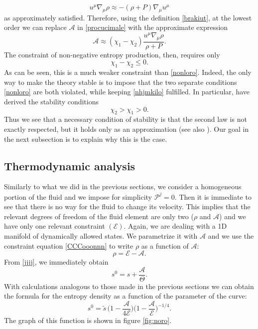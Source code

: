 \documentclass[a4paper, amsfonts, amssymb, amsmath, reprint, showkeys, nofootinbib, twoside]{revtex4-1}
\begin{document}
\begin{equation}\label{bhimogvrnefvo}
u^\mu \nabla_\mu \rho \approx -(\rho+P)\nabla_\mu u^\mu
\end{equation}
as approximately satisfied. Therefore, using the definition \eqref{brakiut}, at the lowest order we can replace $\mathcal{A}$ in \eqref{procucimale} with the approximate expression   
\begin{equation}\label{mleko}
\mathcal{A} \approx (\chi_1-\chi_2) \dfrac{u^\mu \nabla_\mu \rho}{\rho + P}.
\end{equation} 
The constraint of non-negative entropy production, then, requires only
\begin{equation}\label{nhjmkilo}
\chi_1 -\chi_2 \leq 0.
\end{equation}
As can be seen, this is a much weaker constraint than \eqref{nonloro}. Indeed, the only way to make the theory stable is to impose that the two separate conditions \eqref{nonloro} are both violated, while keeping \eqref{nhjmkilo} fulfilled. 
In particular, \citet{Bemfica_2019_nonlinear} have derived the stability conditions  
\begin{equation}\label{maseiserio?}
\chi_2 > \chi_1 >0.
\end{equation}
Thus we see that a necessary condition of stability is that the second law is not exactly respected, but it holds only as an approximation (see also \cite{Poovuttikul2019}). Our goal in the next subsection is to explain why this is the case.

\subsection{Thermodynamic analysis}

Similarly to what we did in the previous sections, we consider a homogeneous portion of the fluid and we impose for simplicity $\mathcal{P}^j=0$. Then it is immediate to see that there is no way for the fluid to change its velocity.  This implies that the relevant degrees of freedom of the fluid element are only two ($\rho$ and $\mathcal{A}$) and we have only one relevant constraint $(\mathcal{E})$. Again, we are dealing with a 1D manifold of dynamically allowed states. We parametrize it with $\mathcal{A}$ and we use the constraint equation \eqref{CCCooonnn} to write $\rho$ as a function of $\mathcal{A}$:
\begin{equation}\label{envokc}
\rho = \mathcal{E}-\mathcal{A}.
\end{equation}
From \eqref{jjjj}, we immediately obtain
\begin{equation}
s^0 = s + \dfrac{\mathcal{A}}{\Theta}.
\end{equation}
With calculations analogous to those made in the previous sections we can obtain the formula for the entropy density as a function of the parameter of the curve:
\begin{equation}\label{sblearf}
s^0 = \tilde{s} \, \bigg( 1-\dfrac{\mathcal{A}}{4\mathcal{E}} \bigg) 
\bigg( 1-\dfrac{\mathcal{A}}{\mathcal{E}} \bigg)^{-1/4} . 
\end{equation}
The graph of this function is shown in figure \ref{fig:noro}.
\end{document}

